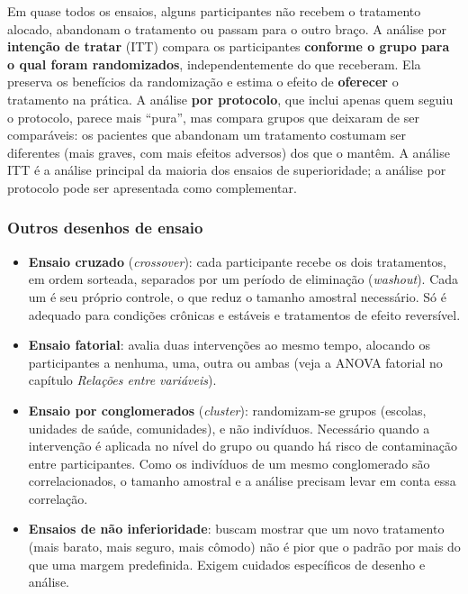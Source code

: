 \documentclass[
]{book}
\providecommand{\tightlist}{%
  \setlength{\itemsep}{0pt}\setlength{\parskip}{0pt}}
\begin{document}
Em quase todos os ensaios, alguns participantes não recebem o tratamento alocado, abandonam o tratamento ou passam para o outro braço. A análise por \textbf{intenção de tratar} (ITT) compara os participantes \textbf{conforme o grupo para o qual foram randomizados}, independentemente do que receberam. Ela preserva os benefícios da randomização e estima o efeito de \textbf{oferecer} o tratamento na prática. A análise \textbf{por protocolo}, que inclui apenas quem seguiu o protocolo, parece mais ``pura'', mas compara grupos que deixaram de ser comparáveis: os pacientes que abandonam um tratamento costumam ser diferentes (mais graves, com mais efeitos adversos) dos que o mantêm. A análise ITT é a análise principal da maioria dos ensaios de superioridade; a análise por protocolo pode ser apresentada como complementar.

\subsubsection{Outros desenhos de ensaio}\label{outros-desenhos-de-ensaio}

\begin{itemize}
\tightlist
\item
  \textbf{Ensaio cruzado} (\emph{crossover}): cada participante recebe os dois tratamentos, em ordem sorteada, separados por um período de eliminação (\emph{washout}). Cada um é seu próprio controle, o que reduz o tamanho amostral necessário. Só é adequado para condições crônicas e estáveis e tratamentos de efeito reversível.
\item
  \textbf{Ensaio fatorial}: avalia duas intervenções ao mesmo tempo, alocando os participantes a nenhuma, uma, outra ou ambas (veja a ANOVA fatorial no capítulo \emph{Relações entre variáveis}).
\item
  \textbf{Ensaio por conglomerados} (\emph{cluster}): randomizam-se grupos (escolas, unidades de saúde, comunidades), e não indivíduos. Necessário quando a intervenção é aplicada no nível do grupo ou quando há risco de contaminação entre participantes. Como os indivíduos de um mesmo conglomerado são correlacionados, o tamanho amostral e a análise precisam levar em conta essa correlação.
\item
  \textbf{Ensaios de não inferioridade}: buscam mostrar que um novo tratamento (mais barato, mais seguro, mais cômodo) não é pior que o padrão por mais do que uma margem predefinida. Exigem cuidados específicos de desenho e análise.
\end{itemize}
\end{document}

